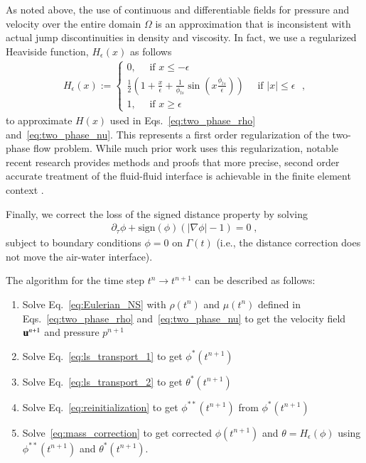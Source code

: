 \documentclass[final,3p,times]{elsarticle}
\newcommand{\sign}{\text{sign}}
\begin{document}
As noted above, the use of continuous and differentiable fields for pressure and velocity over the entire domain $\Omega$ is an approximation that is inconsistent with actual jump discontinuities in density and viscosity. In fact, we use a regularized Heaviside function, $H_\epsilon(x)$ as follows
\begin{align}
\label{eq:approx_H}
   H_{\epsilon}(x) := \begin{cases}
      0, \quad \text{ if }x\leq -\epsilon\\
      \frac{1}{2}(1+\frac{x}{\epsilon}+\frac{1}{\phi_{ls}}\sin(x\frac{\phi_{ls}}{\epsilon}))\quad\text{ if }|x|\leq \epsilon\\
      1, \quad \text{ if }x\geq \epsilon
   \end{cases} \; ,
\end{align}
to approximate $H(x)$ used in Eqs.~\eqref{eq:two_phase_rho} and~\eqref{eq:two_phase_nu}. This represents a first order regularization of the two-phase flow problem. While much prior work uses this regularization, notable recent research provides methods and proofs that more precise, second order accurate treatment of the fluid-fluid interface is achievable in the finite element context \cite{burman2015cutfem,ji2016ifem}.

Finally, we correct the loss of the signed distance property by solving
\begin{align}
\label{eq:reinitialization}
   \partial_\tau \phi + \sign(\phi)(|\nabla\phi|-1) = 0 \; ,
\end{align}
subject to boundary conditions $\phi=0$ on $\Gamma(t)$ (i.e., the distance correction does not move the air-water interface).

\medskip

The algorithm for the time step $t^n \rightarrow t^{n+1}$ can be described as follows:
\begin{enumerate}[label=(\Alph*)]
    \item Solve Eq.~\eqref{eq:Eulerian_NS} with $\rho(t^n)$ and $\mu(t^n)$ defined in Eqs.~\eqref{eq:two_phase_rho} and~\eqref{eq:two_phase_nu} to get the velocity field $\mathbf{u}^{n+1}$ and pressure $p^{n+1}$ \label{listItem:uANDp}
    \item Solve Eq.~\eqref{eq:ls_transport_1} to get $\phi^*(t^{n+1})$
    \item Solve Eq.~\eqref{eq:ls_transport_2} to get $\theta^*(t^{n+1})$
    \item Solve Eq.~\eqref{eq:reinitialization} to get $\phi^{**}(t^{n+1})$ from $\phi^*(t^{n+1})$
    \item Solve~\eqref{eq:mass_correction} to get corrected $\phi(t^{n+1})$ and $\theta=H_{\epsilon}(\phi)$ using $\phi^{**}(t^{n+1})$ and $\theta^*(t^{n+1})$.
\end{enumerate}
\end{document}
